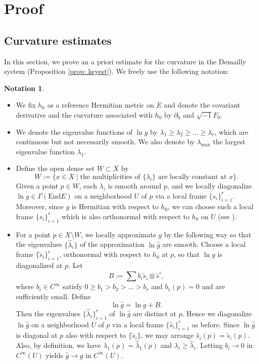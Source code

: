 \documentclass[a4, 12pt, 
]{amsart}
\numberwithin{equation}{section}
\theoremstyle{plain}
\theoremstyle{definition}
\newtheorem{notation}[equation]{Notation}
\theoremstyle{remark}
\begin{document}
\section{Proof}
\subsection{Curvature estimates}\label{sec: curv}

In this section, we prove an a priori estimate for the curvature in the Demailly system (Proposition \ref{prop: keyest}). We freely use the following notation: 

\begin{notation}\label{notation}
\begin{itemize}
    \item
    We fix $h_0$ as a reference Hermitian metric on $E$ and denote the covariant derivative and the curvature associated with $h_0$ by $\partial_0$ and $\sqrt{-1}F_0$.
    \item  We denote the eigenvalue functions of $\ln g$ by $\lambda_1\ge\lambda_2\ge\dots\ge\lambda_r$, which are continuous but not necessarily smooth. We also denote by $\lambda_\mathrm{max}$ the largest eigenvalue function $\lambda_1$.
    \item 
    Define the open dense set $W\subset X$ by
    \begin{equation*}
        W:=\{x\in X\mid \text{the multiplicities of $\{\lambda_i\}$ are locally constant at $x$}\}.
    \end{equation*}    
    Given a point $p\in W$, each $\lambda_i$ is smooth around $p$, and we locally diagonalize $\ln g\in \Gamma(\mathrm{End}E)$ on a neighborhood $U$ of $p$ via a local frame $\{s_i\}_{i=1}^r$.
    Moreover, since $g$ is Hermitian with respect to $h_0$, we can choose such a local frame $\{s_i\}_{i=1}^r$ which is also orthonormal with respect to $h_0$ on $U$ (see \cite[Proposition 7.4.5]{LT}).
    \item 
    For a point $p\in X\setminus W$, we locally approximate $g$ by the following way so that the eigenvalues $\{\hat{\lambda}_i\}$ of the approximation $\ln\hat{g}$ are smooth. Choose a local frame $\{\tilde{s}_i\}_{i=1}^r$, orthonormal with respect to $h_0$ at $p$, so that $\ln g$ is diagonalized at $p$. Let $$B:=\sum b_i \tilde{s}_i\otimes \tilde{s}^i,$$ where $b_i\in C^\infty$ satisfy $0\ge b_1> b_2>\dots > b_r$ and $b_1(p)=0$ and are sufficiently small. Define $$\ln \hat{g}=\ln g+B.$$ Then the eigenvalues $\{\hat{\lambda}_i\}_{i=1}^r$ of $\ln \hat{g}$ are distinct at $p$. Hence we diagonalize $\ln \hat{g}$ on a neighborhood $U$ of $p$ via a local frame $\{\hat{s}_i\}_{i=1}^r$ as before. 
    Since $\ln\hat{g}$ is diagonal at $p$ also with respect to $\{\tilde{s}_i\}$, we may arrange $\hat{s}_i(p)=\tilde{s}_i(p)$. Also, by definition, we have $\lambda_1(p)=\hat{\lambda}_1(p)$ and $\lambda_i\ge\hat{\lambda}_i$. Letting $b_i\to 0$ in $C^\infty(U)$ yields $\hat{g}\to g$ in $C^\infty(U)$.
    

\end{itemize}
\end{notation}
\end{document}
